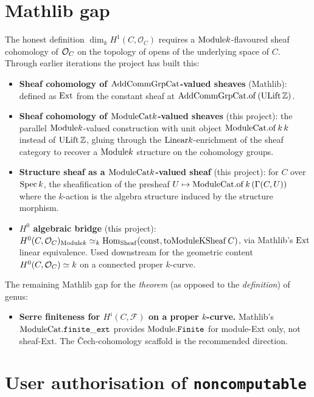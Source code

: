 \section{Mathlib gap}
\label{sec:Genus_status}

The honest definition \(\dim_k H^1(C, \mathcal O_C)\) requires a \(\mathrm{Module} k\)-flavoured sheaf cohomology of \(\mathcal{O}_{C}\) on the topology of opens of the underlying space of \(C\). Through earlier iterations the project has built this:

\begin{itemize}
  \item \textbf{Sheaf cohomology of \(\mathrm{AddCommGrpCat}\)-valued sheaves} (Mathlib): defined as \(\operatorname{Ext}\) from the constant sheaf at \(\mathrm{AddCommGrpCat}.\mathrm{of}\,(\mathrm{ULift}\,\mathbb Z)\).
  \item \textbf{Sheaf cohomology of \(\mathrm{ModuleCat} k\)-valued sheaves} (this project): the parallel \(\mathrm{Module} k\)-valued construction with unit object \(\mathrm{ModuleCat}.\mathrm{of}\,k\,k\) instead of \(\mathrm{ULift}\,\mathbb Z\), gluing through the \(\mathrm{Linear} k\)-enrichment of the sheaf category to recover a \(\mathrm{Module} k\) structure on the cohomology groups.
  \item \textbf{Structure sheaf as a \(\mathrm{ModuleCat} k\)-valued sheaf} (this project): for \(C\) over \(\operatorname{Spec} k\), the sheafification of the presheaf \(U \mapsto \mathrm{ModuleCat}.\mathrm{of}\,k\,(\Gamma(C, U))\) where the \(k\)-action is the algebra structure induced by the structure morphism.
  \item \textbf{\(H^0\) algebraic bridge} (this project): \(H^0(C, \mathcal{O}_{C})_{\mathrm{Module} k} \simeq_k \operatorname{Hom}_{\operatorname{Sheaf}}(\mathrm{const}, \operatorname{toModuleKSheaf} C)\), via Mathlib's \(\operatorname{Ext}\) linear equivalence. Used downstream for the geometric content \(H^0(C, \mathcal{O}_{C}) \simeq k\) on a connected proper \(k\)-curve.
\end{itemize}

The remaining Mathlib gap for the \emph{theorem} (as opposed to the \emph{definition}) of genus:

\begin{itemize}
  \item \textbf{Serre finiteness for \(H^i(C, \mathcal F)\) on a proper \(k\)-curve.} Mathlib's \(\mathrm{ModuleCat}.\mathtt{finite\_ext}\) provides \(\mathrm{Module}.\mathtt{Finite}\) for module-Ext only, not sheaf-Ext. The Čech-cohomology scaffold is the recommended direction.
\end{itemize}

\section{User authorisation of \texttt{noncomputable}}
\label{sec:Genus_noncomputable}

